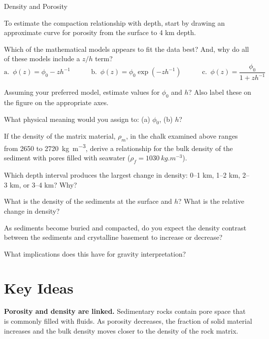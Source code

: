 \begin{activity}{Density and Porosity}
\begin{questions}
    To estimate the compaction relationship with depth, start by drawing an approximate curve for porosity from the surface to 4 km depth.

    Which of the mathematical models appears to fit the data best?  And, why do all of these models include a $z/h$ term?
    \[ 
      \text{a.}\enspace \phi(z) = \phi_0 - z h^{-1} \hspace{3em}
      \text{b.}\enspace \phi(z) = \phi_0 \exp(-z h^{-1}) \hspace{3em}
      \text{c.}\enspace \phi(z) = {\displaystyle\frac{\phi_0}{1 + z h^{-1}}}
    \]
    \answerbox

    \clearpage
    Assuming your preferred model, estimate values for $\phi_0$ and $h$? Also label these on the figure on the appropriate axes.
    \answerbox

    What physical meaning would you assign to: (a) $\phi_0$, (b) $h$?
    \answerbox

    If the density of the matrix material, $\rho_m$, in the chalk examined above ranges from 2650 to \SI{2720}{kg.m^{-3}}, derive a relationship for the bulk density of the sediment with pores filled with seawater ($\rho_f = \SI{1030}{kg.m^{-3}}$).
    \answerbox

    Which depth interval produces the largest change in density: 0--1 km, 1--2 km, 2--3 km, or 3--4 km?  Why?
    \answerbox[36pt]

    What is the density of the sediments at the surface and $h$?  What is the relative change in density?
    \answerbox

    As sediments become buried and compacted, do you expect the density contrast between the sediments and crystalline basement to increase or decrease?
    \answerbox[24pt]

    What implications does this have for gravity interpretation?
    \answerbox

\end{questions}

\section*{Key Ideas}

\textbf{Porosity and density are linked.}
Sedimentary rocks contain pore space that is commonly filled with fluids. As porosity decreases, the fraction of solid material increases and the bulk density moves closer to the density of the rock matrix.


\end{activity}
